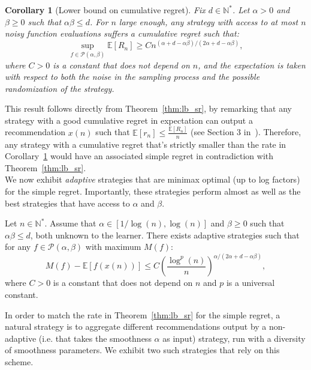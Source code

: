 \documentclass[final,12pt]{colt2018}
\newtheorem{cor}{Corollary}
\begin{document}
\begin{cor}[Lower bound on cumulative regret]\label{cor_lb_cr}
Fix $d \in \mathbb N^*$. Let $\alpha > 0$ and $\beta \geq 0$ such that $\alpha\beta \leq d$. For $n$ large enough, any strategy with access to at most $n$ noisy function evaluations suffers a cumulative regret such that:
$$
\sup_{f \in \mathcal P(\alpha,\beta)} \mathbb E[R_n] \geq C n^{(\alpha+d-\alpha\beta)/(2\alpha+d-\alpha\beta)},
$$
where $C > 0$ is a constant that does not depend on $n$, and the expectation is taken with respect to both the noise in the sampling process and the possible randomization of the strategy.
\end{cor}
This result follows directly from Theorem~\ref{thm:lb_sr}, by remarking that any strategy with a good cumulative regret in expectation can output a recommendation $x(n)$ such that $\mathbb E[r_n] \leq \frac{\mathbb E[R_n]}{n}$ (see Section 3 in~\cite{bubeck2011pure}). Therefore, any strategy with a cumulative regret that's strictly smaller than the rate in Corollary~\ref{cor_lb_cr} would have an associated simple regret in contradiction with Theorem~\ref{thm:lb_sr}.\\

We now exhibit \emph{adaptive} strategies that are minimax optimal (up to log factors) for the simple regret. Importantly, these strategies perform almost as well as the best strategies that have access to $\alpha$ and $\beta$.

\begin{theorem}\label{thm_adap_sr}
Let $n \in \mathbb N^*$. Assume that $\alpha \in [1/\log(n), \log(n)]$ and $\beta \geq 0$ such that $\alpha\beta \leq d$, both unknown to the learner. There exists adaptive strategies such that for any $f \in \mathcal P(\alpha,\beta)$ with maximum $M(f)$:
$$
M(f) - \mathbb E[f(x(n))] \leq C \left(\frac{\log^p(n)}{n}\right)^{\alpha/(2\alpha+d-\alpha\beta)},
$$
where $C > 0$ is a constant that does not depend on $n$ and $p$ is a universal constant.
\end{theorem}
In order to match the rate in Theorem~\ref{thm:lb_sr} for the simple regret, a natural strategy is to aggregate different recommendations output by a non-adaptive (i.e. that takes the smoothness $\alpha$ as input) strategy, run with a diversity of smoothness parameters. We exhibit two such strategies that rely on this scheme.\\
\end{document}
